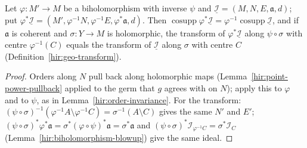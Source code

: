 \begin{lemma}
\label{hir:biholomorphism-transform}
\leanok
Let \(\varphi\colon M'\to M\) be a biholomorphism with inverse \(\psi\) and \(\underline{\mathcal I}=(M,N,E,\mathfrak a,d)\); put
\(\varphi^*\underline{\mathcal I}=(M',\varphi^{-1}N,\varphi^{-1}E,\varphi^*\mathfrak a,d)\). Then \(\operatorname{cosupp}\varphi^*\underline{\mathcal I}=\varphi^{-1}\operatorname{cosupp}\underline{\mathcal I}\), and if
\(\mathfrak a\) is coherent and \(\sigma\colon Y\to M\) is holomorphic, the transform of \(\varphi^*\underline{\mathcal I}\) along \(\psi\circ\sigma\) with centre \(\varphi^{-1}(C)\) equals
the transform of \(\underline{\mathcal I}\) along \(\sigma\) with centre \(C\) (Definition~\ref{hir:geo-transform}).
\end{lemma}
\begin{proof}
\leanok
Orders along \(N\) pull back along holomorphic maps (Lemma~\ref{hir:point-power-pullback} applied to the germ that \(g\) agrees with on \(N\)); apply this to
\(\varphi\) and to \(\psi\), as in Lemma~\ref{hir:order-invariance}. For the transform: \((\psi\circ\sigma)^{-1}(\varphi^{-1}A\setminus\varphi^{-1}C)=\sigma^{-1}(A\setminus C)\) gives the same
\(N'\) and \(E'\); \((\psi\circ\sigma)^*\varphi^*\mathfrak a=\sigma^*(\varphi\circ\psi)^*\mathfrak a=\sigma^*\mathfrak a\) and \((\psi\circ\sigma)^*\mathcal I_{\varphi^{-1}C}=\sigma^*\mathcal I_C\)
(Lemma~\ref{hir:biholomorphism-blowup}) give the same ideal.
\end{proof}